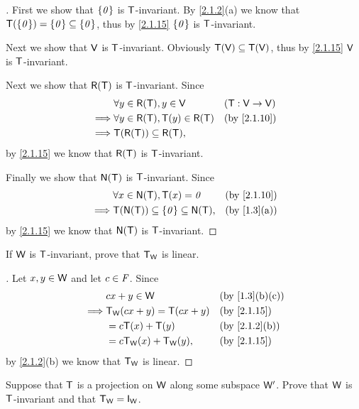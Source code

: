 \begin{proof}[]
  First we show that \(\left\lbrace\mathit{0}\right\rbrace\) is \(\mathsf{T}\)-invariant.
  By \cref{2.1.2}(a) we know that \(\mathsf{T}(\left\lbrace\mathit{0}\right\rbrace) = \left\lbrace\mathit{0}\right\rbrace \subseteq \left\lbrace\mathit{0}\right\rbrace\), thus by \cref{2.1.15} \(\left\lbrace\mathit{0}\right\rbrace\) is \(\mathsf{T}\)-invariant.

  Next we show that \(\mathsf{V}\) is \(\mathsf{T}\)-invariant.
  Obviously \(\mathsf{T}(\mathsf{V}) \subseteq \mathsf{T}(\mathsf{V})\), thus by \cref{2.1.15} \(\mathsf{V}\) is \(\mathsf{T}\)-invariant.

  Next we show that \(\rg{\T}\) is \(\mathsf{T}\)-invariant.
  Since
  \begin{align*}
             & \forall y \in \rg{\T}, y \in \V          &  & (\T : \V \to \V) \\
    \implies & \forall y \in \rg{\T}, \T(y) \in \rg{\T} &  & \by{2.1.10}      \\
    \implies & \T(\rg{\T}) \subseteq \rg{\T},
  \end{align*}
  by \cref{2.1.15} we know that \(\rg{\T}\) is \(\mathsf{T}\)-invariant.

  Finally we show that \(\ns{\T}\) is \(\mathsf{T}\)-invariant.
  Since
  \begin{align*}
             & \forall x \in \ns{\T}, \T(x) = \zv                 &  & \by{2.1.10} \\
    \implies & \T(\ns{\T}) \subseteq \set{\zv} \subseteq \ns{\T}, &  & \by{1.3}[a]
  \end{align*}
  by \cref{2.1.15} we know that \(\ns{\T}\) is \(\mathsf{T}\)-invariant.
\end{proof}

\begin{ex}\label{ex:2.1.29}
  If \(\mathsf{W}\) is \(\mathsf{T}\)-invariant, prove that \(\mathsf{T}_{\mathsf{W}}\) is linear.
\end{ex}

\begin{proof}[]
  Let \(x, y \in \mathsf{W}\) and let \(c \in \mathit{F}\).
  Since
  \begin{align*}
             & cx + y \in \W                &  & \by{1.3}[b,c] \\
    \implies & \T_{\W}(cx + y) = \T(cx + y) &  & \by{2.1.15}   \\
             & = c \T(x) + \T(y)            &  & \by{2.1.2}[b] \\
             & = c \T_{\W}(x) + \T_{\W}(y), &  & \by{2.1.15}
  \end{align*}
  by \cref{2.1.2}(b) we know that \(\mathsf{T}_{\mathsf{W}}\) is linear.
\end{proof}

\begin{ex}\label{ex:2.1.30}
  Suppose that \(\mathsf{T}\) is a projection on \(\mathsf{W}\) along some subspace \(\mathsf{W}'\).
  Prove that \(\mathsf{W}\) is \(\mathsf{T}\)-invariant and that \(\T_{\W} = \IT[\W]\).
\end{ex}

